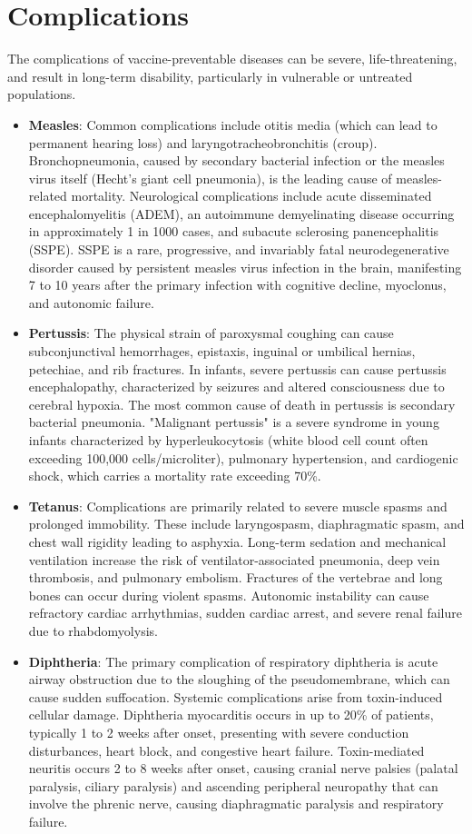 \section*{Complications}
The complications of vaccine-preventable diseases can be severe, life-threatening, and result in long-term disability, particularly in vulnerable or untreated populations.
\begin{itemize}
    \item \textbf{Measles}: Common complications include otitis media (which can lead to permanent hearing loss) and laryngotracheobronchitis (croup). Bronchopneumonia, caused by secondary bacterial infection or the measles virus itself (Hecht's giant cell pneumonia), is the leading cause of measles-related mortality. Neurological complications include acute disseminated encephalomyelitis (ADEM), an autoimmune demyelinating disease occurring in approximately 1 in 1000 cases, and subacute sclerosing panencephalitis (SSPE). SSPE is a rare, progressive, and invariably fatal neurodegenerative disorder caused by persistent measles virus infection in the brain, manifesting 7 to 10 years after the primary infection with cognitive decline, myoclonus, and autonomic failure.
    \item \textbf{Pertussis}: The physical strain of paroxysmal coughing can cause subconjunctival hemorrhages, epistaxis, inguinal or umbilical hernias, petechiae, and rib fractures. In infants, severe pertussis can cause pertussis encephalopathy, characterized by seizures and altered consciousness due to cerebral hypoxia. The most common cause of death in pertussis is secondary bacterial pneumonia. "Malignant pertussis" is a severe syndrome in young infants characterized by hyperleukocytosis (white blood cell count often exceeding 100,000 cells/microliter), pulmonary hypertension, and cardiogenic shock, which carries a mortality rate exceeding 70\%.
    \item \textbf{Tetanus}: Complications are primarily related to severe muscle spasms and prolonged immobility. These include laryngospasm, diaphragmatic spasm, and chest wall rigidity leading to asphyxia. Long-term sedation and mechanical ventilation increase the risk of ventilator-associated pneumonia, deep vein thrombosis, and pulmonary embolism. Fractures of the vertebrae and long bones can occur during violent spasms. Autonomic instability can cause refractory cardiac arrhythmias, sudden cardiac arrest, and severe renal failure due to rhabdomyolysis.
    \item \textbf{Diphtheria}: The primary complication of respiratory diphtheria is acute airway obstruction due to the sloughing of the pseudomembrane, which can cause sudden suffocation. Systemic complications arise from toxin-induced cellular damage. Diphtheria myocarditis occurs in up to 20\% of patients, typically 1 to 2 weeks after onset, presenting with severe conduction disturbances, heart block, and congestive heart failure. Toxin-mediated neuritis occurs 2 to 8 weeks after onset, causing cranial nerve palsies (palatal paralysis, ciliary paralysis) and ascending peripheral neuropathy that can involve the phrenic nerve, causing diaphragmatic paralysis and respiratory failure.

\end{itemize}
